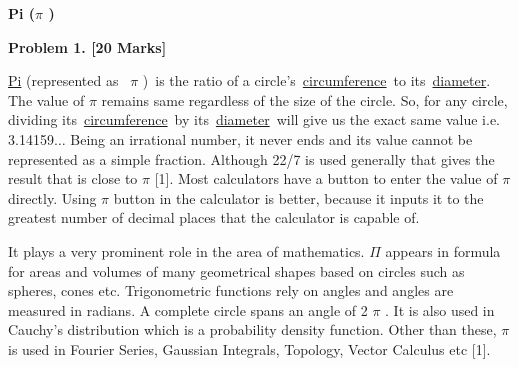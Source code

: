 \documentclass[12pt]{article}
\begin{document}
\vspace{\baselineskip}

\vspace{\baselineskip}

\vspace{\baselineskip}

\vspace{\baselineskip}

\vspace{\baselineskip}

\vspace{\baselineskip}

\vspace{\baselineskip}

\vspace{\baselineskip}
\begin{Center}
{\fontsize{14pt}{16.8pt}\selectfont \textbf{Pi ($ \pi $ )}\par}
\end{Center}\par

\begin{justify}
{\fontsize{14pt}{16.8pt}\selectfont \textbf{Problem 1. [20 Marks]}\par}
\end{justify}\par

\begin{justify}
\href{https://www.wonderopolis.org/wonder/what-is-pi}{Pi} (represented as  $ \pi $ ) is the ratio of a circle's \href{https://www.wonderopolis.org/wonder/what-is-pi}{circumference} to its \href{https://www.wonderopolis.org/wonder/what-is-pi}{diameter}. The value of $ \pi $  remains same regardless of the size of the circle. So, for any circle, dividing its \href{https://www.wonderopolis.org/wonder/what-is-pi}{circumference} by its \href{https://www.wonderopolis.org/wonder/what-is-pi}{diameter} will give us the exact same value i.e. 3.14159$ \ldots $  Being an irrational number, it never ends and its value cannot be represented as a simple fraction. Although 22/7 is used generally that gives the result that is close to $ \pi $  [1].  Most calculators have a button to enter the value of $ \pi $  directly. Using $ \pi $  button in the calculator is better, because it inputs it to the greatest number of decimal places that the calculator is capable of.
\end{justify}\par

\begin{justify}
It plays a very prominent role in the area of mathematics. $ \Pi $  appears in formula for areas and volumes of many geometrical shapes based on circles such as spheres, cones etc. Trigonometric functions rely on angles and angles are measured in radians. A complete circle spans an angle of 2 $ \pi $ . It is also used in Cauchy’s distribution which is a probability density function. Other than these, $ \pi $  is used in Fourier Series, Gaussian Integrals, Topology, Vector Calculus etc [1].
\end{justify}\par
\end{document}
